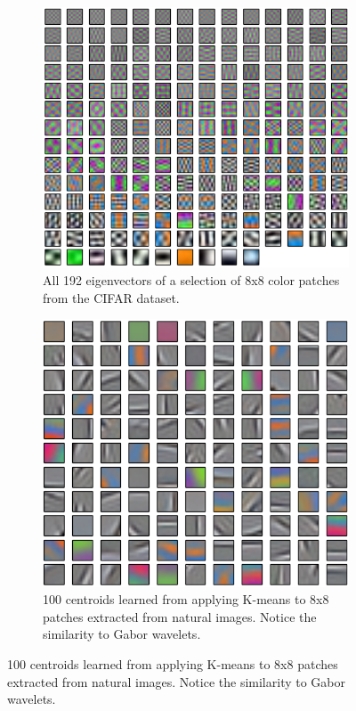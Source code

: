 \documentclass{article} %
\begin{document}
\begin{figure}
  \centering
  \begin{subfigure}[h]{0.45\columnwidth}
    \includegraphics[width=\columnwidth]{./images/eigs192.png}
    \caption{All 192 eigenvectors of a selection of 8x8 color patches from the CIFAR dataset.}
    \label{figEigenvectors}
  \end{subfigure}
  \hspace{0.04\columnwidth}
  \centering
  \begin{subfigure}[h]{0.45\columnwidth}
    \includegraphics[width=\columnwidth]{./images/patches100.png}
    \caption{100 centroids learned from applying K-means to 8x8 patches extracted from natural images. Notice the similarity to Gabor wavelets.}
    \label{fig_centroids}
  \end{subfigure}
\end{figure}
\end{document}
